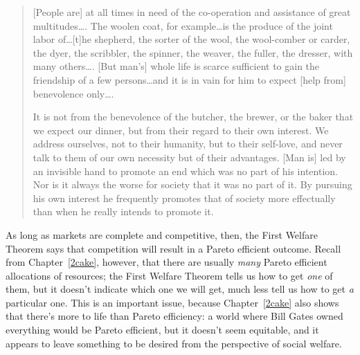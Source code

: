 \begin{quotation}
[People are] at all times in need of the co-operation and assistance of great multitudes\ldots . The woolen coat, for example\ldots is the produce of the joint labor of\ldots [t]he shepherd, the sorter of the wool, the wool-comber or carder, the dyer, the scribbler, the spinner, the weaver, the fuller, the dresser, with many others\ldots . [But man's] whole life is scarce sufficient to gain the friendship of a few persons\ldots and it is in vain for him to expect [help from] benevolence only\ldots .

It is not from the benevolence of the butcher, the brewer, or the baker that we expect our dinner, but from their regard to their own interest. We address ourselves, not to their humanity, but to their self-love, and never talk to them of our own necessity but of their advantages. [Man is] led by an invisible hand to promote an end which was no part of his intention. Nor is it always the worse for society that it was no part of it. By pursuing his own interest he frequently promotes that of society more effectually than when he really intends to promote it.
\end{quotation}



As long as markets are complete and competitive, then, the First Welfare Theorem says that competition will result in a Pareto efficient outcome. Recall from Chapter~\ref{2cake}, however, that there are usually \emph{many} Pareto efficient allocations of resources; the First Welfare Theorem tells us how to get \emph{one} of them, but it doesn't indicate which one we will get, much less tell us how to get \emph{a} particular one. This is an important issue, because Chapter~\ref{2cake} also shows that there's more to life than Pareto efficiency: a world where Bill Gates owned everything would be Pareto efficient, but it doesn't seem equitable, and it appears to leave something to be desired from the perspective of social welfare.

